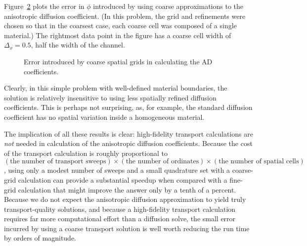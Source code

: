 \begin{figure}[htb]
  \centering
{}%
%
  \label{fig:ssSingleMgD}
\end{figure}

Figure~\ref{fig:ssSingleMgConv} plots the error in $\phi$ introduced by using
coarse approximations to the anisotropic diffusion coefficient. (In this
problem, the grid and refinements were chosen so that in the coarsest case, each
coarse cell was composed of a single material.) 
The rightmost data point in the figure has a coarse cell width of
$\Delta_x=0.5$, half the width of the channel.
\begin{figure}[htb]
  \centering
  
  \caption{Error introduced by coarse spatial grids in calculating the AD
  coefficients.}
  \label{fig:ssSingleMgConv}
\end{figure}
Clearly, in this simple problem with well-defined material boundaries, the
solution is relatively insensitive to using less spatially refined diffusion
coefficients. This is perhaps not surprising, as, for example, the standard
diffusion coefficient has no spatial variation inside a homogeneous material.

The implication of all these results is clear: high-fidelity transport
calculations are \emph{not} needed in calculation of the anisotropic diffusion
coefficients. Because the cost of the transport calculation is
roughly proportional to $
  (\text{the number of transport sweeps}) \times 
  (\text{the number of ordinates}) \times 
  (\text{the number of spatial cells})$,
using only a modest number of sweeps and a small quadrature set with a
coarse-grid calculation can provide a substantial speedup when compared with a
fine-grid calculation that might improve the answer only by a tenth of a
percent. Because we do not expect the anisotropic diffusion approximation to
yield truly transport-quality solutions, and because a high-fidelity transport
calculation requires far more computational effort than a diffusion solve, the
small error incurred by using a coarse transport solution is well worth reducing
the run time by orders of magnitude.

